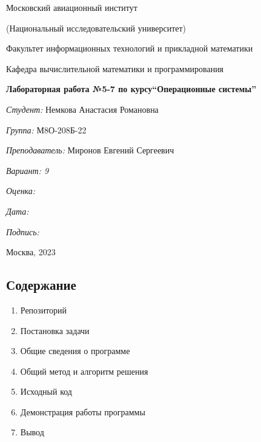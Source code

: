 \documentclass[a4paper, 14pt]{article}
\begin{document}
\thispagestyle{empty}	
\begin{center}
	Московский авиационный институт
	
	(Национальный исследовательский университет)
	
	Факультет информационных технологий и прикладной математики
	
	Кафедра вычислительной математики и программирования
	
\end{center}
\vspace{40ex}
\begin{center}
	\textbf{\large{Лабораторная работа №5-7 по курсу\linebreak \textquotedblleft Операционные системы\textquotedblright}}
\end{center}
\vspace{35ex}
\begin{flushright}
	\textit{Студент: } Немкова Анастасия Романовна
	
	\vspace{2ex}
	\textit{Группа: } М8О-208Б-22
	
	\vspace{2ex}
	\textit{Преподаватель: } Миронов Евгений Сергеевич
	
	\vspace{2ex}
	\textit{Вариант: 9} 
	
	\vspace{2ex}
	\textit{Оценка: } \underline{\quad\quad\quad\quad\quad\quad}
	
	 \vspace{2ex}
	\textit{Дата: } \underline{\quad\quad\quad\quad\quad\quad}
	
	\vspace{2ex}
	\textit{Подпись: } \underline{\quad\quad\quad\quad\quad\quad}
	
\end{flushright}

\vspace{5ex}

\begin{vfill}
	\begin{center}
		Москва, 2023
	\end{center}	
\end{vfill}
\newpage

\begin{center}
\section*{Содержание}   
\end{center}
\vspace{5ex}
\begin{enumerate}
  \item Репозиторий
  \item Постановка задачи
  \item Общие сведения о программе
  \item Общий метод и алгоритм решения
  \item Исходный код
  \item Демонстрация работы программы
  \item Вывод
\end{enumerate}
\newpage
\end{document}
